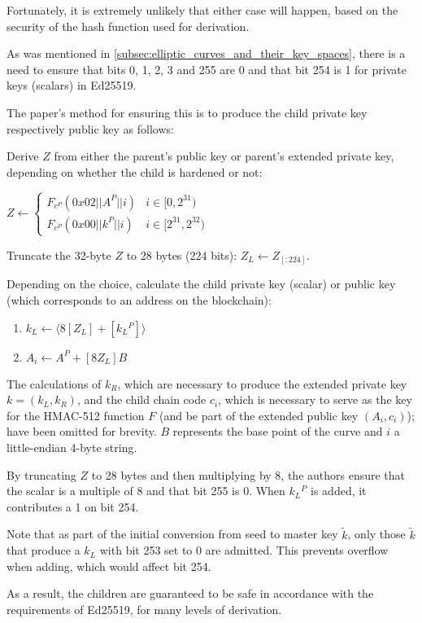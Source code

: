 \documentclass[12pt, a4paper, twocolumn]{article}
\begin{document}
Fortunately, it is extremely unlikely that either case will happen, based on the security of the hash function used for derivation.

As was mentioned in \cref{subsec:elliptic_curves_and_their_key_spaces}, there is a need to ensure that bits 0, 1, 2, 3 and 255 are 0 and that bit 254 is 1 for private keys (scalars) in Ed25519.

The paper's method for ensuring this is to produce the child private key respectively public key as follows:

Derive $Z$ from either the parent's public key or parent's extended private key, depending on whether the child is hardened or not:

$  Z \leftarrow 
  \begin{cases} 
  F_{c^P}(0x02||A^P||i) & i \in  [0, 2^{31}) \\
  F_{c^P}(0x00||k^P||i) & i \in [2^{31}, 2^{32})
  \end{cases}
  $

Truncate the 32-byte $Z$ to 28 bytes (224 bits): $Z_L \leftarrow Z_{[:224]}$.

Depending on the choice, calculate the child private key (scalar) or public key (which corresponds to an address on the blockchain):

\begin{enumerate}[label={}] 
  \item $k_L \leftarrow \langle 8[Z_L]  + [k{_L}^P]\rangle$ 
  \item $A_i \leftarrow A^P + [8Z_L]B$
\end{enumerate}


The calculations of $k_R$, which are necessary to produce the extended private key $k = (k_L, k_R)$, and the child chain code $c_i$, which is necessary to serve as the key for the HMAC-512 function $F$ (and be part of the extended public key $(A_i, c_i)$); have been omitted for brevity. $B$ represents the base point of the curve and $i$ a little-endian 4-byte string.

By truncating $Z$ to 28 bytes and then multiplying by 8, the authors ensure that the scalar is a multiple of 8 and that bit 255 is 0. When $k{_L}^P$ is added, it contributes a 1 on bit 254.

Note that as part of the initial conversion from seed to master key $\tilde{k}$, only those $\tilde{k}$ that produce a $k_L$ with bit 253 set to 0 are admitted. This prevents overflow when adding, which would affect bit 254.

As a result, the children are guaranteed to be safe in accordance with the requirements of Ed25519, for many levels of derivation.
\end{document}
